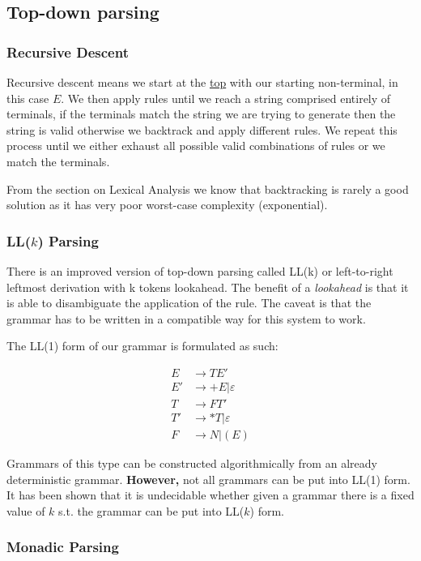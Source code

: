 \documentclass{article}
\renewcommand{\i}[1]{\textit{#1}}
\renewcommand{\u}[1]{\underline{#1}}
\newcommand{\rarr}{\rightarrow}
\begin{document}
\subsection{Top-down parsing}
\subsubsection{Recursive Descent}
Recursive descent means we start at the \u{top} with our starting non-terminal, in this case $E$. We then apply rules until we reach a string comprised entirely of terminals, if the terminals match the string we are trying to generate then the string is valid otherwise we backtrack and apply different rules. We repeat this process until we either exhaust all possible valid combinations of rules or we match the terminals.

From the section on Lexical Analysis we know that backtracking is rarely a good solution as it has very poor worst-case complexity (exponential).

\subsubsection{LL($k$) Parsing}
There is an improved version of top-down parsing called LL(k) or left-to-right leftmost derivation with k tokens lookahead. The benefit of a \i{lookahead} is that it is able to disambiguate the application of the rule. The caveat is that the grammar has to be written in a compatible way for this system to work.

The LL(1) form of our grammar is formulated as such:

\begin{align*}
    E &\rarr T E' \\
    E' &\rarr + E | \varepsilon \\
    T &\rarr F T' \\
    T' &\rarr * T| \varepsilon \\
    F &\rarr N | ( E )
\end{align*}

Grammars of this type can be constructed algorithmically from an already deterministic grammar. \textbf{However,} not all grammars can be put into LL(1) form. It has been shown that it is undecidable whether given a grammar there is a fixed value of $k$ s.t. the grammar can be put into LL($k$) form.

\subsubsection{Monadic Parsing}
\end{document}
